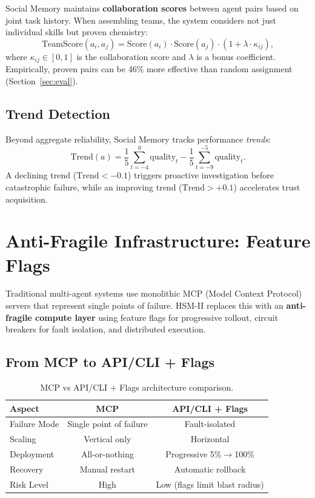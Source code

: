 \documentclass[11pt]{article}
\begin{document}
Social Memory maintains \textbf{collaboration scores} between agent pairs based
on joint task history. When assembling teams, the system considers not just
individual skills but proven chemistry:
\begin{equation}
  \text{TeamScore}(a_i, a_j) = \text{Score}(a_i) \cdot \text{Score}(a_j) \cdot (1 + \lambda \cdot \kappa_{ij}),
\end{equation}
where $\kappa_{ij} \in [0,1]$ is the collaboration score and $\lambda$ is a
bonus coefficient. Empirically, proven pairs can be 46\% more effective than
random assignment (Section~\ref{sec:eval}).

\subsection{Trend Detection}

Beyond aggregate reliability, Social Memory tracks performance \emph{trends}:
\begin{equation}
  \text{Trend}(a) = \frac{1}{5}\sum_{t=-4}^{0} \text{quality}_t - \frac{1}{5}\sum_{t=-9}^{-5} \text{quality}_t.
\end{equation}
A declining trend ($\text{Trend} < -0.1$) triggers proactive investigation
before catastrophic failure, while an improving trend ($\text{Trend} > +0.1$)
accelerates trust acquisition.

\section{Anti-Fragile Infrastructure: Feature Flags}
\nopagebreak[4]
\label{sec:feature_flags}

Traditional multi-agent systems use monolithic MCP (Model Context Protocol)
servers that represent single points of failure. HSM-II replaces this with an
\textbf{anti-fragile compute layer} using feature flags for progressive rollout,
circuit breakers for fault isolation, and distributed execution.

\subsection{From MCP to API/CLI + Flags}

\begin{table}[H]
\centering
\caption{MCP vs API/CLI + Flags architecture comparison.}
\label{tab:flags_compare}
\small
\begin{tabular}{lcc}
\toprule
\textbf{Aspect} & \textbf{MCP} & \textbf{API/CLI + Flags} \\
\midrule
Failure Mode & Single point of failure & Fault-isolated \\
Scaling & Vertical only & Horizontal \\
Deployment & All-or-nothing & Progressive 5\%$\rightarrow$100\% \\
Recovery & Manual restart & Automatic rollback \\
Risk Level & High & Low (flags limit blast radius) \\
\bottomrule
\end{tabular}
\end{table}
\end{document}
